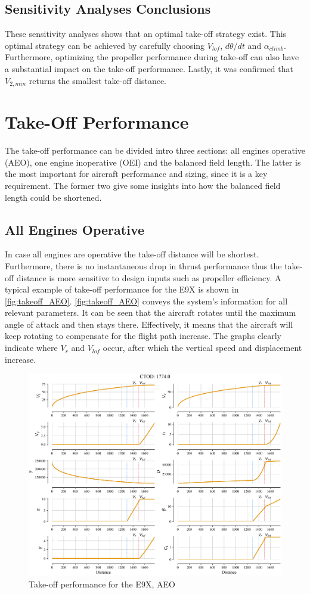 \subsection{Sensitivity Analyses Conclusions}\label{sec:sensitivity_conclusions}
These sensitivity analyses shows that an optimal take-off strategy exist. This optimal strategy can be achieved by carefully choosing $V_{lof}$, $d\theta/dt$ and $\alpha_{climb}$. Furthermore, optimizing the propeller performance during take-off can also have a substantial impact on the take-off performance. Lastly, it was confirmed that $V_{2,min}$ returns the smallest take-off distance.

\section{Take-Off Performance}\label{sec:takeoff_performance}
The take-off performance can be divided intro three sections: all engines operative (AEO), one engine inoperative (OEI) and the balanced field length. The latter is the most important for aircraft performance and sizing, since it is a key requirement. The former two give some insights into how the balanced field length could be shortened.

\subsection{All Engines Operative}\label{sec:AEO}
In case all engines are operative the take-off distance will be shortest. Furthermore, there is no instantaneous drop in thrust performance thus the take-off distance is more sensitive to design inputs such as propeller efficiency. A typical example of take-off performance for the E9X is shown in \autoref{fig:takeoff_AEO}. \autoref{fig:takeoff_AEO} conveys the system's information for all relevant parameters. It can be seen that the aircraft rotates until the maximum angle of attack and then stays there. Effectively, it means that the aircraft will keep rotating to compensate for the flight path increase. The graphs clearly indicate where $V_r$ and $V_{lof}$ occur, after which the vertical speed and displacement increase.

\begin{figure}[!ht]
    \centering
    \includegraphics[width=0.8\linewidth]{figures/E9X_takeoff_level2b_ctod.png}
    \caption{Take-off performance for the E9X, AEO}
    \label{fig:takeoff_AEO}
\end{figure}

